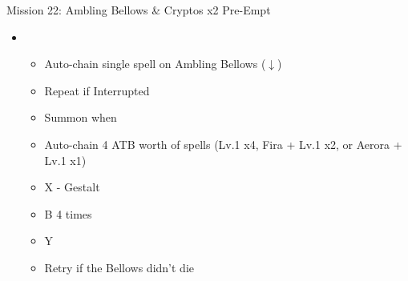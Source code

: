 \begin{multicols}{2}
  \vfill
  \begin{battle}{Mission 22: Ambling Bellows \& Cryptos x2 Pre-Empt}
    \begin{itemize}
      \item \second
            \begin{itemize}
              \item Auto-chain single spell on Ambling Bellows ($\downarrow$)
              \item Repeat if Interrupted
              \item Summon when \stagger\
              \item Auto-chain 4 ATB worth of spells (Lv.1 x4, Fira + Lv.1 x2, or Aerora + Lv.1 x1)
              \item X - Gestalt
              \item B 4 times
              \item Y
              \item Retry if the Bellows didn't die
            \end{itemize}
    \end{itemize}
  \end{battle}

  \renewcommand{\sixth}{[6] Aggression (\com/\rav/\com)}


\end{multicols}

